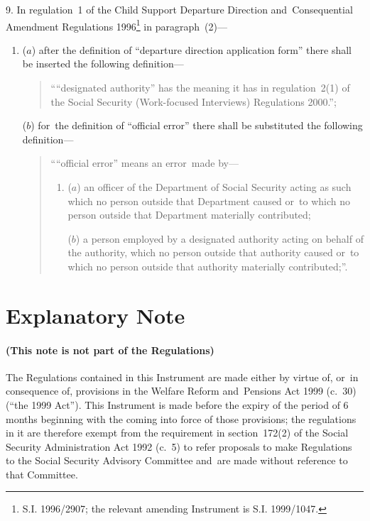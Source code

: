 \documentclass[12pt,a4paper]{article}
\begin{document}
\medskip

9.  In regulation~1 of the Child Support Departure Direction and~Consequential Amendment Regulations 1996\footnote{\frenchspacing S.I. 1996/2907; the relevant amending Instrument is S.I. 1999/1047.} in paragraph~(2)—
\begin{enumerate}\item[]
($a$) after the definition of “departure direction application form” there shall be inserted the following definition—
\begin{quotation}
    ““designated authority” has the meaning it has in regulation~2(1) of the Social Security (Work-focused Interviews) Regulations 2000.”; 
\end{quotation}

($b$) for~the definition of “official error” there shall be substituted the following definition—
\begin{quotation}
    ““official error” means an error~made by—
\begin{enumerate}\item[]
    ($a$) 
    an officer of the Department of Social Security acting as such which no person outside that Department caused or~to which no person outside that Department materially contributed;

    ($b$) 
    a person employed by a designated authority acting on behalf of the authority, which no person outside that authority caused or~to which no person outside that authority materially contributed;”.
\end{enumerate}
\end{quotation}
\end{enumerate}

\part{Explanatory Note}

\renewcommand\parthead{— Explanatory Note}

\subsection*{(This note is not part of the Regulations)}

The Regulations contained in this Instrument are made either by virtue of, or~in consequence of, provisions in the Welfare Reform and~Pensions Act 1999 (c.~30) (“the 1999 Act”). This Instrument is made before the expiry of the period of 6 months beginning with the coming into force of those provisions; the regulations in it are therefore exempt from the requirement in section~172(2) of the Social Security Administration Act 1992 (c.\ 5) to refer proposals to make Regulations to the Social Security Advisory Committee and~are made without reference to that Committee.
\end{document}

